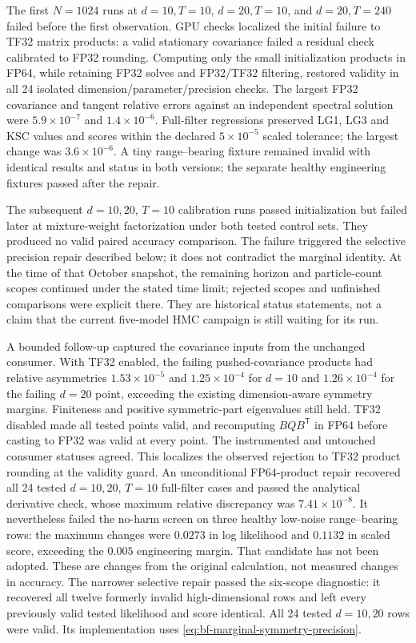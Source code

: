 The first $N=1024$ runs at $d=10,T=10$, $d=20,T=10$, and
$d=20,T=240$ failed before the first observation. GPU checks localized the
initial failure to TF32 matrix products: a valid stationary covariance failed
a residual check calibrated to FP32 rounding. Computing only the small
initialization products in FP64, while retaining FP32 solves and FP32/TF32
filtering, restored validity in all 24 isolated dimension/parameter/precision
checks. The largest FP32 covariance and tangent relative errors against an
independent spectral solution were $5.9\times10^{-7}$ and
$1.4\times10^{-6}$. Full-filter regressions preserved LG1, LG3 and KSC values
and scores within the declared $5\times10^{-5}$ scaled tolerance; the largest
change was $3.6\times10^{-6}$. A tiny range--bearing fixture remained invalid
with identical results and status in both versions; the separate healthy
engineering fixtures passed after the repair.

The subsequent $d=10,20$, $T=10$ calibration runs passed initialization but
failed later at mixture-weight factorization under both tested control sets.
They produced no valid paired accuracy comparison. The failure triggered
the selective precision repair described below; it does not contradict the
marginal identity.
At the time of that October snapshot, the remaining horizon and particle-count
scopes continued under the stated time limit; rejected scopes and unfinished
comparisons were explicit there.  They are historical status statements, not a
claim that the current five-model HMC campaign is still waiting for its run.

A bounded follow-up captured the covariance inputs from the unchanged consumer.
With TF32 enabled, the failing pushed-covariance products had relative
asymmetries $1.53\times10^{-5}$ and $1.25\times10^{-4}$ for $d=10$ and
$1.26\times10^{-4}$ for the failing $d=20$ point, exceeding the existing
dimension-aware symmetry margins. Finiteness and positive symmetric-part
eigenvalues still held. TF32 disabled made all tested points valid, and
recomputing $BQB^{\mathsf T}$ in FP64 before casting to FP32 was valid at every
point. The instrumented and untouched consumer statuses agreed. This localizes
the observed rejection to TF32 product rounding at the validity guard. An unconditional FP64-product repair recovered all 24 tested
$d=10,20$, $T=10$ full-filter cases and passed the analytical derivative
check, whose maximum relative discrepancy was $7.41\times10^{-8}$.
It nevertheless failed the no-harm screen on three healthy low-noise
range--bearing rows: the maximum changes were $0.0273$ in log likelihood
and $0.1132$ in scaled score, exceeding the $0.005$ engineering margin.
That candidate has not been adopted. These are changes from the original
calculation, not measured changes in accuracy. The narrower selective repair
passed the six-scope diagnostic: it recovered all twelve formerly invalid
high-dimensional rows and left every previously valid tested likelihood and
score identical. All 24 tested $d=10,20$ rows were valid. Its implementation
uses \eqref{eq:bf-marginal-symmetry-precision}.

